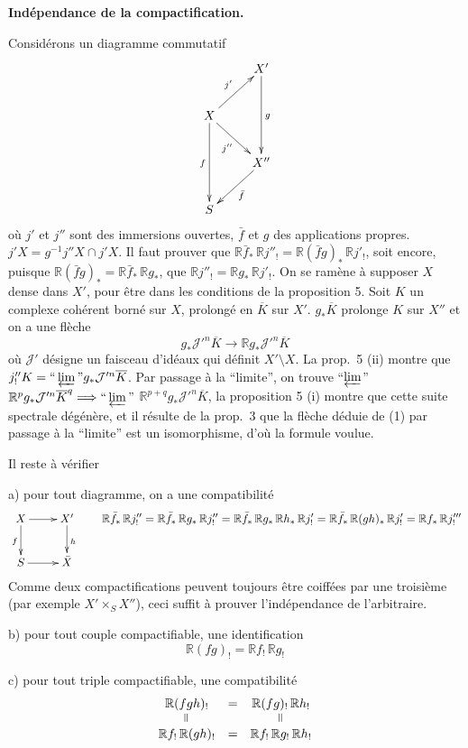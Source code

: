 \documentclass[12pt]{amsart}
\theoremstyle{plain}
\theoremstyle{definition}
\newcommand{\cJ}{\mathcal{J}}
\newcommand{\bR}{\mathbb{R}}
\begin{document}
\textbf{Ind\'ependance de la compactification.}

Consid\'erons un diagramme commutatif
\[
\xymatrix{
& X' \ar[dd]^{g} \\
X \ar[ur]^{j'} \ar[dr]_{j''} \ar[dd]_{f} & \\
& X'' \ar[dl]^{\bar{f}} \\
S &
}
\]
o\`u $j'$ et $j''$ sont des immersions ouvertes, $\bar{f}$ et $g$ des applications propres. $j'X = g^{-1}j''X \cap j'X$. Il faut prouver que $\bR\bar{f}_{*}\,\bR j''_{!} = \bR(\bar{f}g)_{*}\,\bR j'_{!}$, soit encore, puisque $\bR(\bar{f}g)_{*} = \bR\bar{f}_{*}\,\bR g_{*}$, que $\bR j''_{!} = \bR g_{*}\,\bR j'_{!}$. On se ram\`ene \`a supposer $X$ dense dans $X'$, pour \^etre dans les conditions de la proposition 5. Soit $K$ un complexe coh\'erent born\'e sur $X$, prolong\'e en $\overline{K}$ sur $X'$. $g_{*}\overline{K}$ prolonge $K$ sur $X''$ et on a une fl\`eche
\begin{equation}
g_{*}\cJ'^{n}\overline{K} \to \bR g_{*}\cJ'^{n}\overline{K}
\end{equation}
o\`u $\cJ'$ d\'esigne un faisceau d'id\'eaux qui d\'efinit $X' \setminus X$. La prop.\ 5 (ii) montre que $j''_{!}K = \text{``}\varprojlim\text{''} g_{*}\cJ'^{n}\overline{K}$. Par passage \`a la ``limite'', on trouve ``$\varprojlim$'' $\bR^{p}g_{*}\cJ'^{n}\overline{K}^{q} \Longrightarrow \text{``}\varprojlim\text{''}$ $\bR^{p+q}g_{*}\cJ'^{n}\overline{K}$, la proposition 5 (i) montre que cette suite spectrale d\'eg\'en\`ere, et il r\'esulte de la prop.\ 3 que la fl\`eche d\'eduie de (1) par passage \`a la ``limite'' est un isomorphisme, d'o\`u la formule voulue.

Il reste \`a v\'erifier

a) pour tout diagramme, on a une compatibilit\'e
\[
\xymatrix{
X \ar[r] \ar[d]_{f} & X' \ar[d]^{h} \\
S \ar[r] & \bar{X}
}
\qquad
\bR\bar{f}_{*}\,\bR j''_{!} = \bR\bar{f}_{*}\,\bR g_{*}\,\bR j''_{!} = \bR\bar{f}_{*}\,\bR g_{*}\,\bR h_{*}\,\bR j'_{!} = \bR\bar{f}_{*}\,\bR(gh)_{*}\,\bR j'_{!} = \bR f_{*}\,\bR j'''_{!}
\]
Comme deux compactifications peuvent toujours \^etre coiff\'ees par une troisi\`eme (par exemple $X' \times_{S} X''$), ceci suffit \`a prouver l'ind\'ependance de l'arbitraire.

b) pour tout couple compactifiable, une identification
\[
\bR(fg)_{!} = \bR f_{!}\,\bR g_{!}
\]

c) pour tout triple compactifiable, une compatibilit\'e
\[
\begin{array}{ccc}
\bR(fgh)_{!} & = & \bR(fg)_{!}\,\bR h_{!} \\
\rotatebox{90}{$=$} & & \rotatebox{90}{$=$} \\
\bR f_{!}\,\bR(gh)_{!} & = & \bR f_{!}\,\bR g_{!}\,\bR h_{!}
\end{array}
\]
\end{document}
